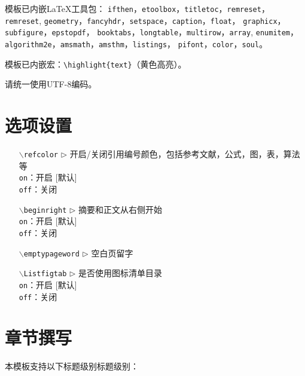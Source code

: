 模板已内嵌LaTeX工具包： 
 {\tt ifthen}，{\tt etoolbox}，{\tt titletoc}，{\tt remreset}，{\tt remreset}, 
 {\tt geometry}，{\tt fancyhdr}，{\tt setspace}，{\tt caption}，{\tt float}， 
 {\tt graphicx}，{\tt subfigure}，{\tt epstopdf}，
 {\tt book\-tabs}，{\tt longtable}，{\tt multirow}，{\tt array}, {\tt enumitem}， 
 {\tt algorithm2e}，{\tt amsmath}，{\tt amsthm}，{\tt listings}，
 {\tt pifont}，{\tt color}，{\tt soul}。

模板已内嵌宏：\verb|\highlight{text}|（黄色高亮）。

请统一使用UTF-8编码。



\section{选项设置}

\begin{itemize}[leftmargin=3cm]
  \item[{\tt  $\backslash$refcolor} $\triangleright$]  开启/关闭引用编号颜色，包括参考文献，公式，图，表，算法等\\
  \texttt{on}：开启 [默认]\\
  \texttt{off}：关闭
  \item[{\tt $\backslash$beginright} $\triangleright$]  摘要和正文从右侧开始\\
  \texttt{on}：开启 [默认]\\
  \texttt{off}：关闭
  \item[{\tt $\backslash$emptypageword} $\triangleright$]  空白页留字
  \item[{\tt $\backslash$Listfigtab} $\triangleright$]  是否使用图标清单目录\\
  \texttt{on}：开启 [默认]\\
  \texttt{off}：关闭
\end{itemize}


\section{章节撰写}
本模板支持以下标题级别标题级别：

